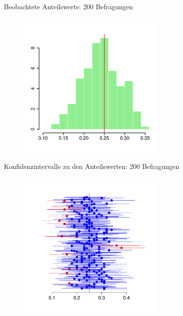 \documentclass[usenames,dvipsnames,handout]{beamer}
\begin{document}
\begin{frame}{Beobachtete Anteilswerte: 200 Befragungen}
  \begin{figure}[ht]
 	\centering
 	      \includegraphics[width=0.65\textwidth]{prob_est200.pdf}%
 	\end{figure}
\end{frame}

\begin{frame}{Konfidenzintervalle zu den Anteilswerten: 200 Befragungen}
  \begin{figure}[ht]
 	\centering
 	      \includegraphics[width=0.65\textwidth]{confi200.pdf}%
 	\end{figure}
\end{frame}
\end{document}
